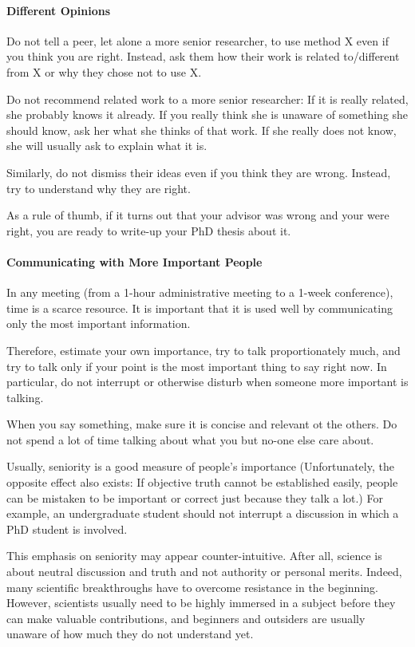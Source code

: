 \documentclass[12pt]{article}
\begin{document}
\paragraph{Different Opinions}
Do not tell a peer, let alone a more senior researcher, to use method X even if you think you are right.
Instead, ask them how their work is related to/different from X or why they chose not to use X.

Do not recommend related work to a more senior researcher: If it is really related, she probably knows it already.
If you really think she is unaware of something she should know, ask her what she thinks of that work.
If she really does not know, she will usually ask to explain what it is.

Similarly, do not dismiss their ideas even if you think they are wrong.
Instead, try to understand why they are right.

As a rule of thumb, if it turns out that your advisor was wrong and your were right, you are ready to write-up your PhD thesis about it.

\paragraph{Communicating with More Important People}
In any meeting (from a 1-hour administrative meeting to a 1-week conference), time is a scarce resource.
It is important that it is used well by communicating only the most important information.

Therefore, estimate your own importance, try to talk proportionately much, and try to talk only if your point is the most important thing to say right now.
In particular, do not interrupt or otherwise disturb when someone more important is talking.

When you say something, make sure it is concise and relevant ot the others.
Do not spend a lot of time talking about what you but no-one else care about.
\medskip

Usually, seniority is a good measure of people's importance
(Unfortunately, the opposite effect also exists: If objective truth cannot be established easily, people can be mistaken to be important or correct just because they talk a lot.)
For example, an undergraduate student should not interrupt a discussion in which a PhD student is involved.
\medskip

This emphasis on seniority may appear counter-intuitive.
After all, science is about neutral discussion and truth and not authority or personal merits.
Indeed, many scientific breakthroughs have to overcome resistance in the beginning.
However, scientists usually need to be highly immersed in a subject before they can make valuable contributions, and beginners and outsiders are usually unaware of how much they do not understand yet.
\end{document}
